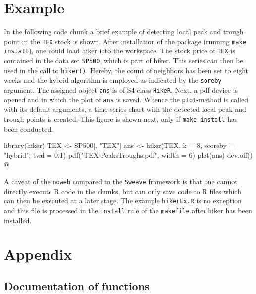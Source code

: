 \documentclass[a4paper]{article}
\newcommand{\pkg}[1]{{\fontseries{b}\selectfont #1}}
\begin{document}
\section{Example}
\label{S4}

In the following code chunk a brief example of detecting local peak
and trough point in the \verb?TEX? stock is shown. After installation of
the package (running \verb?make install?), one could load \pkg{hiker}
into the workspace. The stock price of \verb?TEX? is contained in the
data set \verb?SP500?, which is part of \pkg{hiker}. This series can then
be used in the call to \verb?hiker()?. Hereby, the count of neighbors
has been set to eight weeks and the hybrid algorithm is employed as
indicated by the \verb?soreby? argument. The assigned object \verb?ans? is
of S4-class \verb?HikeR?. Next, a pdf-device is opened and in which the
plot of \verb?ans? is saved. Whence the \verb?plot?-method is called with
its default arguments, a time series chart with the detected local
peak and trough points is created. This figure is shown next, only if
\verb?make install? has been conducted.

\nwenddocs{}\endmoddef\let\nwnotused=\nwoutput{}
library(hiker)
TEX <- SP500[, "TEX"]
ans <- hiker(TEX, k = 8, scoreby = "hybrid", tval = 0.1)
pdf("TEX-PeaksTroughs.pdf", width = 6)
plot(ans)
dev.off()
\nwnotused{hikerEx.R}\nwendcode{}@

A caveat of the \verb?noweb? compared to the \verb?Sweave? framework is that
one cannot directly execute R code in the chunks, but can only save
code to R files which can then be executed at a later stage. The
example \verb?hikerEx.R? is no exception and this file is processed in
the \verb?install? rule of the \verb?makefile? after \pkg{hiker} has been
installed.



\section{Appendix}
\label{S5}

\subsection{Documentation of functions}
\label{S5SS1}
\end{document}

